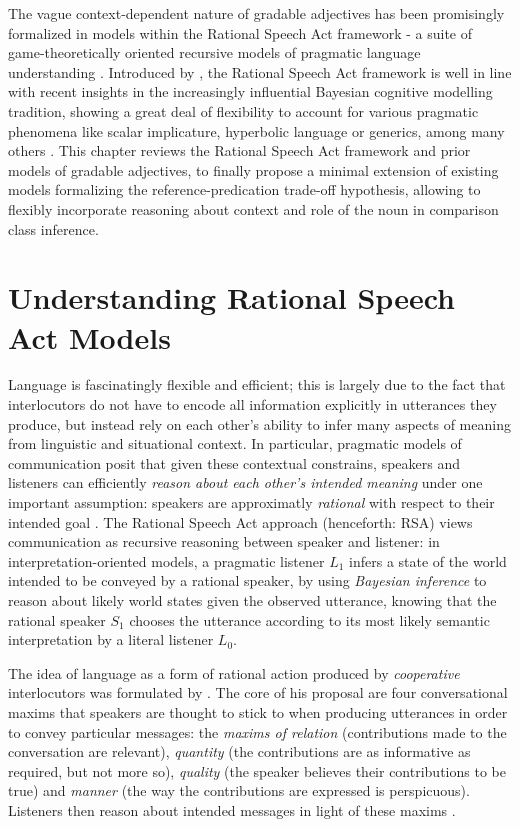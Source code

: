 The vague context-dependent nature of gradable adjectives has been promisingly formalized in models within the Rational Speech Act framework -  a suite of game-theoretically oriented recursive models of pragmatic language understanding \parencite[e.g.,][]{goodman2016, lassiter2017adjectival, tessler2017warm}. Introduced by \textcite{frank2012predicting}, the Rational Speech Act framework is well in line with recent insights in the increasingly influential Bayesian cognitive modelling tradition, showing a great deal of flexibility to account for various pragmatic phenomena like scalar implicature, hyperbolic language or generics, among many others \parencite[e.g.,][]{tenenbaum2011grow, problang}. This chapter reviews the Rational Speech Act framework and prior models of gradable adjectives, to finally propose a minimal extension of existing models formalizing the reference-predication trade-off hypothesis, allowing to flexibly incorporate reasoning about context and role of the noun in comparison class inference. 
  
\section{Understanding Rational Speech Act Models}

Language is fascinatingly flexible and efficient; this is largely due to the fact that interlocutors do not have to encode all information explicitly in utterances they produce, but instead rely on each other's ability to infer many aspects of meaning from linguistic and situational context. In particular, pragmatic models of communication posit that given these contextual constrains, speakers and listeners can efficiently \emph{reason about each other's intended meaning} under one important assumption: speakers are approximatly \emph{rational} with respect to their intended goal \parencite{frank2012predicting}. The Rational Speech Act approach (henceforth: RSA) views communication as recursive reasoning between speaker and listener: in interpretation-oriented models, a pragmatic listener $L_1$ infers a state of the world intended to be conveyed by a rational speaker, by using \emph{Bayesian inference} to reason about likely world states given the observed utterance, knowing that the rational speaker $S_1$ chooses the utterance according to its most likely semantic interpretation by a literal listener $L_0$.  

The idea of language as a form of rational action produced by \emph{cooperative} interlocutors was formulated by \textcite{grice1975logic}. The core of his proposal are four conversational maxims that speakers are thought to stick to when producing utterances in order to convey particular messages: the \emph{maxims of relation} (contributions made to the conversation are relevant), \emph{quantity} (the contributions are as informative as required, but not more so), \emph{quality} (the speaker believes their contributions to be true) and \emph{manner} (the way the contributions are expressed is perspicuous). Listeners then reason about intended messages in light of these maxims \parencite{grice1975logic}.

